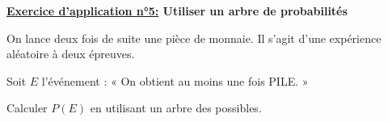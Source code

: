 \documentclass[12pt]{article}
\begin{document}
\begin{mdframed}[
    linewidth=1pt,
    roundcorner=5pt,
    linecolor=RoyalBlue,
    innertopmargin=10pt,
    innerbottommargin=10pt
]
{\color{RoyalBlue}
\textbf{\underline{Exercice d'application n°5:} Utiliser un arbre de probabilités}}

\vspace{5pt}
On lance deux fois de suite une pièce de monnaie. Il s’agit d’une expérience aléatoire à deux
épreuves.

\vspace{5pt}
Soit $E$ l’événement : « On obtient au moins une fois PILE. »

\vspace{5pt}
Calculer $P(E)$ en utilisant un arbre des possibles.

\begin{minipage}[t]{.5\textwidth}%
    \vspace{0pt}
    \vspace{0.5cm}
    {\color{black!30}\dotfill}

    \vspace{0.5cm}
    {\color{black!30}\dotfill}

    \vspace{0.5cm}
    {\color{black!30}\dotfill}

    \vspace{0.5cm}
    {\color{black!30}\dotfill}

    \vspace{40pt}
\end{minipage}%
\hfill
\begin{minipage}[t]{.45\textwidth}%
    \vspace{0pt}
    
\end{minipage}%


\end{mdframed}
\end{document}
